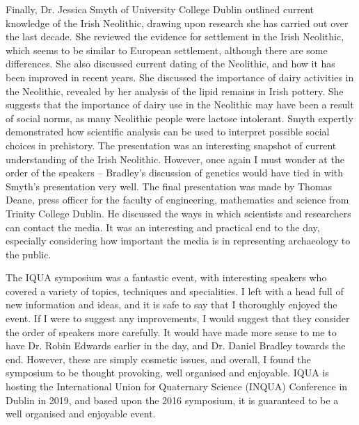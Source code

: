 Finally, Dr. Jessica Smyth of University College Dublin outlined current knowledge of the Irish Neolithic, drawing upon research she has carried out over the last decade. She reviewed the evidence for settlement in the Irish Neolithic, which seems to be similar to European settlement, although there are some differences. She also discussed current dating of the Neolithic, and how it has been improved in recent years. She discussed the importance of dairy activities in the Neolithic, revealed by her analysis of the lipid remains in Irish pottery. She suggests that the importance of dairy use in the Neolithic may have been a result of social norms, as many Neolithic people were lactose intolerant. Smyth expertly demonstrated how scientific analysis can be used to interpret possible social choices in prehistory. The presentation was an interesting snapshot of current understanding of the Irish Neolithic. However, once again I must wonder at the order of the speakers – Bradley’s discussion of genetics would have tied in with Smyth’s presentation very well. 
The final presentation was made by Thomas Deane, press officer for the faculty of engineering, mathematics and science from Trinity College Dublin. He discussed the ways in which scientists and researchers can contact the media. It was an interesting and practical end to the day, especially considering how important the media is in representing archaeology to the public. 

The IQUA symposium was a fantastic event, with interesting speakers who covered a variety of topics, techniques and specialities. I left with a head full of new information and ideas, and it is safe to say that I thoroughly enjoyed the event. If I were to suggest any improvements, I would suggest that they consider the order of speakers more carefully. It would have made more sense to me to have Dr. Robin Edwards earlier in the day, and Dr. Daniel Bradley towards the end. However, these are simply cosmetic issues, and overall, I found the symposium to be thought provoking, well organised and enjoyable. IQUA is hosting the International Union for Quaternary Science (INQUA) Conference in Dublin in 2019, and based upon the 2016 symposium, it is guaranteed to be a well organised and enjoyable event. 

\IJSRAclosing%

%